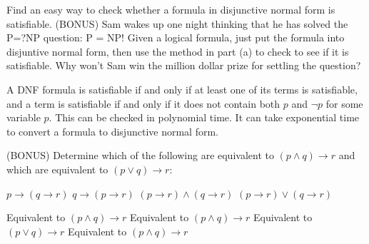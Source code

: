 \documentclass[solution, letterpaper]{cs20inclass}
\begin{document}
\problem

\subproblem Find an easy way to check whether a formula in disjunctive normal form is satisfiable.
\subproblem (BONUS) Sam wakes up one night thinking that he has solved the P=?NP question:  P = NP!  Given a logical formula, just put the formula into disjuntive normal form, then use the method in part (a) to check to see if it is satisfiable. Why won't Sam win the million dollar prize for settling the question?

\begin{solution}
\subsolution A DNF formula is satisfiable if and only if at least one of its terms is satisfiable, and a term is satisfiable if and only if it does not contain both $p$ and $\lnot p$ for some variable $p$. This can be checked in polynomial time.
\subsolution It can take exponential time to convert a formula to disjunctive normal form.
\end{solution}

\problem

(BONUS) Determine which of the following are equivalent to $(p \land q) \rightarrow r$ and which are equivalent to $(p \lor q) \rightarrow r$:

\subproblem $p \rightarrow (q \rightarrow r)$
\subproblem $q \rightarrow (p \rightarrow r)$
\subproblem $(p \rightarrow r) \land (q \rightarrow r)$
\subproblem $(p \rightarrow r) \lor (q \rightarrow r)$

\begin{solution}
\subsolution Equivalent to $(p \land q) \rightarrow r$
\subsolution Equivalent to $(p \land q) \rightarrow r$
\subsolution Equivalent to $(p \lor q) \rightarrow r$
\subsolution Equivalent to $(p \land q) \rightarrow r$
\end{solution}
\end{document}
